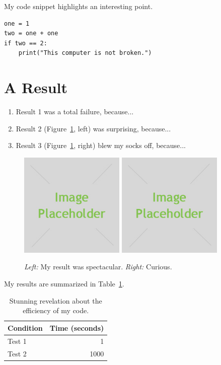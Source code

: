 My code snippet highlights an interesting point.
\begin{lstlisting}
one = 1
two = one + one
if two == 2:
    print("This computer is not broken.")

\end{lstlisting}

\section*{A Result}

\begin{enumerate}
    \item Result 1 was a total failure, because...
    \item Result 2 (Figure~\ref{fig:result1}, left) was surprising, because...
    \item Result 3 (Figure~\ref{fig:result1}, right) blew my socks off, because...
\end{enumerate}

\begin{figure}[h]
    \centering
    \includegraphics[width=5cm]{placeholder.jpg}
    \includegraphics[width=5cm]{placeholder.jpg}
    \caption{\emph{Left:} My result was spectacular. \emph{Right:} Curious.}
    \label{fig:result1}
\end{figure}

My results are summarized in Table~\ref{tab:table1}.

\begin{table}[h]
    \centering
    \begin{tabular}{lr}
        \toprule
        Condition & Time (seconds) \\
        \midrule
        Test 1 & 1 \\
        Test 2 & 1000 \\
        \bottomrule
    \end{tabular}
    \caption{Stunning revelation about the efficiency of my code.}
    \label{tab:table1}
\end{table}


